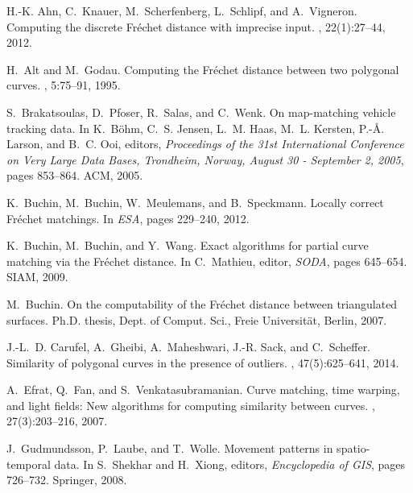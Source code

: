 \documentclass[a4paper,11pt]{article}
\begin{document}
\begin{thebibliography}{50}

H.-K. Ahn, C.~Knauer, M.~Scherfenberg, L.~Schlipf, and A.~Vigneron.
\newblock Computing the discrete {F}r{\'e}chet distance with imprecise input.
, 22(1):27--44, 2012.

H.~Alt and M.~Godau.
\newblock Computing the {F}r{\'e}chet distance between two polygonal curves.
, 5:75--91, 1995.

S.~Brakatsoulas, D.~Pfoser, R.~Salas, and C.~Wenk.
\newblock On map-matching vehicle tracking data.
\newblock In K.~B{\"o}hm, C.~S. Jensen, L.~M. Haas, M.~L. Kersten, P.-{\AA}.
  Larson, and B.~C. Ooi, editors, {\em Proceedings of the 31st International
  Conference on Very Large Data Bases, Trondheim, Norway, August 30 - September
  2, 2005}, pages 853--864. ACM, 2005.

K.~Buchin, M.~Buchin, W.~Meulemans, and B.~Speckmann.
\newblock Locally correct {F}r{\'e}chet matchings.
\newblock In {\em ESA}, pages 229--240, 2012.

K.~Buchin, M.~Buchin, and Y.~Wang.
\newblock Exact algorithms for partial curve matching via the {F}r{\'e}chet
  distance.
\newblock In C.~Mathieu, editor, {\em SODA}, pages 645--654. SIAM, 2009.

M.~Buchin.
\newblock On the computability of the {F}r\'{e}chet distance between
  triangulated surfaces.
\newblock Ph.D. thesis, Dept. of Comput. Sci., Freie Universit\"{a}t, Berlin,
  2007.

J.-L.~D. Carufel, A.~Gheibi, A.~Maheshwari, J.-R. Sack, and C.~Scheffer.
\newblock Similarity of polygonal curves in the presence of outliers.
, 47(5):625--641, 2014.

A.~Efrat, Q.~Fan, and S.~Venkatasubramanian.
\newblock Curve matching, time warping, and light fields: New algorithms for
  computing similarity between curves.
, 27(3):203--216,
  2007.

J.~Gudmundsson, P.~Laube, and T.~Wolle.
\newblock Movement patterns in spatio-temporal data.
\newblock In S.~Shekhar and H.~Xiong, editors, {\em Encyclopedia of GIS}, pages
  726--732. Springer, 2008.


\end{thebibliography}
\end{document}
